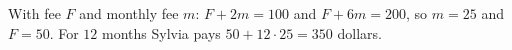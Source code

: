 With fee $F$ and monthly fee $m$: $F+2m=100$ and $F+6m=200$, so $m=25$ and $F=50$. For $12$ months Sylvia pays $50+12\cdot25=\boxed{350}$ dollars.
